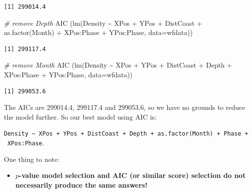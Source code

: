 \documentclass[
  oneside]{krantz}
\newenvironment{Shaded}{\begin{snugshade}}{\end{snugshade}}
\newcommand{\AttributeTok}[1]{\textcolor[rgb]{0.77,0.63,0.00}{#1}}
\newcommand{\CommentTok}[1]{\textcolor[rgb]{0.56,0.35,0.01}{\textit{#1}}}
\newcommand{\FunctionTok}[1]{\textcolor[rgb]{0.00,0.00,0.00}{#1}}
\newcommand{\NormalTok}[1]{#1}
\newcommand{\SpecialCharTok}[1]{\textcolor[rgb]{0.00,0.00,0.00}{#1}}
\providecommand{\tightlist}{%
  \setlength{\itemsep}{0pt}\setlength{\parskip}{0pt}}
\begin{document}
\begin{verbatim}
[1] 299014.4
\end{verbatim}

\begin{Shaded}
\begin{Highlighting}[]
\CommentTok{\# remove Depth}
\FunctionTok{AIC}\NormalTok{ (}\FunctionTok{lm}\NormalTok{(Density }\SpecialCharTok{\textasciitilde{}}\NormalTok{ XPos }\SpecialCharTok{+}\NormalTok{ YPos }\SpecialCharTok{+}\NormalTok{ DistCoast }\SpecialCharTok{+} \FunctionTok{as.factor}\NormalTok{(Month) }\SpecialCharTok{+} 
\NormalTok{          XPos}\SpecialCharTok{:}\NormalTok{Phase }\SpecialCharTok{+}\NormalTok{ YPos}\SpecialCharTok{:}\NormalTok{Phase, }\AttributeTok{data=}\NormalTok{wfdata))}
\end{Highlighting}
\end{Shaded}

\begin{verbatim}
[1] 299117.4
\end{verbatim}

\begin{Shaded}
\begin{Highlighting}[]
\CommentTok{\# remove Month}
\FunctionTok{AIC}\NormalTok{ (}\FunctionTok{lm}\NormalTok{(Density }\SpecialCharTok{\textasciitilde{}}\NormalTok{ XPos }\SpecialCharTok{+}\NormalTok{ YPos }\SpecialCharTok{+}\NormalTok{ DistCoast }\SpecialCharTok{+}\NormalTok{ Depth }\SpecialCharTok{+} 
\NormalTok{          XPos}\SpecialCharTok{:}\NormalTok{Phase }\SpecialCharTok{+}\NormalTok{ YPos}\SpecialCharTok{:}\NormalTok{Phase, }\AttributeTok{data=}\NormalTok{wfdata))}
\end{Highlighting}
\end{Shaded}

\begin{verbatim}
[1] 299053.6
\end{verbatim}

\normalsize

The AICs are 299014.4, 299117.4 and 299053.6, so we have no grounds to reduce the model further. So our best model using AIC is:

\texttt{Density\ \textasciitilde{}\ XPos\ +\ YPos\ +\ DistCoast\ +\ Depth\ +\ as.factor(Month)\ +\ Phase\ +\ XPos:Phase}.

One thing to note:

\begin{itemize}
\tightlist
\item
  \textbf{\(p\)-value model selection and AIC (or similar score) selection do not necessarily produce the same answers!}
\end{itemize}
\end{document}
